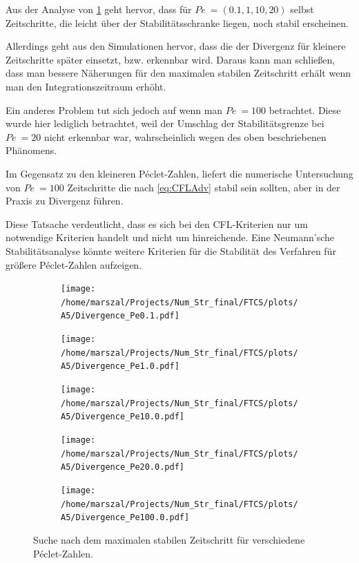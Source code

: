 Aus der Analyse von \cref{fig:stab} geht hervor, dass für $Pe~=(0.1,1,10,20)$ selbst Zeitschritte, die leicht über der Stabilitätsschranke liegen, noch stabil erscheinen.

Allerdings geht aus den Simulationen hervor, dass die der Divergenz für kleinere Zeitschritte später einsetzt, bzw. erkennbar wird. Daraus kann man schließen, dass man bessere Näherungen für den maximalen stabilen Zeitschritt erhält wenn man den Integrationszeitraum erhöht.

Ein anderes Problem tut sich jedoch auf wenn man $Pe~=100$ betrachtet. Diese wurde hier lediglich betrachtet, weil der Umschlag der Stabilitätsgrenze bei $Pe~=20$ nicht erkennbar war, wahrscheinlich wegen des oben beschriebenen Phänomens.

Im Gegensatz zu den kleineren Péclet-Zahlen, liefert die numerische Untersuchung von $Pe~=100$ Zeitschritte die nach \cref{eq:CFLAdv} stabil sein sollten, aber in der Praxis zu Divergenz führen.

Diese Tatsache verdeutlicht, dass es sich bei den CFL-Kriterien nur um notwendige Kriterien handelt und nicht um hinreichende. Eine Neumann'sche Stabilitätsanalyse könnte weitere Kriterien für die Stabilität des Verfahren für größere Péclet-Zahlen aufzeigen.

\begin{figure}
  \centering
  \begin{subfigure}[b]{0.5\textwidth}
  \texttt{[image: /home/marszal/Projects/Num\_Str\_final/FTCS/plots/A5/Divergence\_Pe0.1.pdf]}
  \end{subfigure}
  \hspace{-0.5cm}
  \centering
  \begin{subfigure}[b]{0.5\textwidth}
  \texttt{[image: /home/marszal/Projects/Num\_Str\_final/FTCS/plots/A5/Divergence\_Pe1.0.pdf]}
  \end{subfigure}
  \hspace{-0.5cm}
  \centering
  \begin{subfigure}[b]{0.5\textwidth}
  \texttt{[image: /home/marszal/Projects/Num\_Str\_final/FTCS/plots/A5/Divergence\_Pe10.0.pdf]}
  \end{subfigure}
  \hspace{-0.5cm}
  \centering
  \begin{subfigure}[b]{0.5\textwidth}
  \texttt{[image: /home/marszal/Projects/Num\_Str\_final/FTCS/plots/A5/Divergence\_Pe20.0.pdf]}
  \end{subfigure}
  \hspace{-0.5cm}
  \centering
  \begin{subfigure}[b]{0.5\textwidth}
  \texttt{[image: /home/marszal/Projects/Num\_Str\_final/FTCS/plots/A5/Divergence\_Pe100.0.pdf]}
  \end{subfigure}
  \caption{Suche nach dem maximalen stabilen Zeitschritt für verschiedene Péclet-Zahlen.}\label{fig:stab}
\end{figure}
